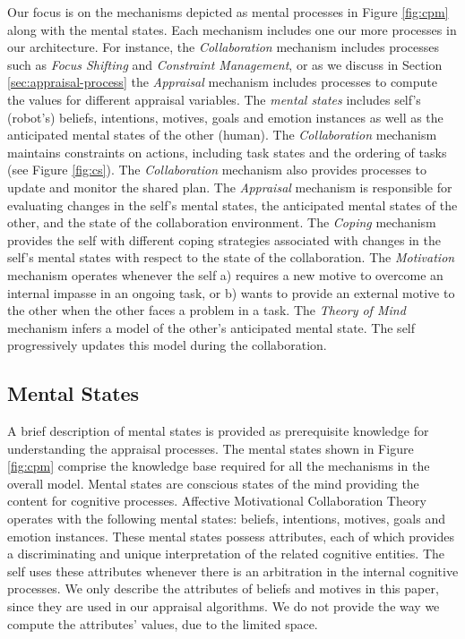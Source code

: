 \documentclass{aamas2016}
\begin{document}
Our focus is on the mechanisms depicted as mental processes in Figure
\ref{fig:cpm} along with the mental states. Each mechanism includes one our
more processes in our architecture. For instance, the \textit{Collaboration}
mechanism includes processes such as \textit{Focus Shifting} and
\textit{Constraint Management}, or as we discuss in Section
\ref{sec:appraisal-process} the \textit{Appraisal} mechanism includes processes
to compute the values for different appraisal variables. The \textit{mental
states} includes self's (robot's) beliefs, intentions, motives, goals and
emotion instances as well as the anticipated mental states of the other (human).
The \textit{Collaboration} mechanism maintains constraints on actions, including
task states and the ordering of tasks (see Figure \ref{fig:cs}). The
\textit{Collaboration} mechanism also provides processes to update and monitor
the shared plan. The \textit{Appraisal} mechanism is responsible for evaluating
changes in the self's mental states, the anticipated mental states of the other,
and the state of the collaboration environment. The \textit{Coping} mechanism
provides the self with different coping strategies associated with changes in
the self's mental states with respect to the state of the collaboration. The
\textit{Motivation} mechanism operates whenever the self a) requires a new
motive to overcome an internal impasse in an ongoing task, or b) wants to
provide an external motive to the other when the other faces a problem in a
task. The \textit{Theory of Mind} mechanism infers a model of the other's
anticipated mental state. The self progressively updates this model during the
collaboration.

\subsection{Mental States}
\label{sec:mental-states}

A brief description of mental states is provided as prerequisite knowledge for
understanding the appraisal processes. The mental states shown in Figure
\ref{fig:cpm} comprise the knowledge base required for all the mechanisms in the
overall model. Mental states are conscious states of the mind providing the
content for cognitive processes. Affective Motivational Collaboration Theory
operates with the following mental states: beliefs, intentions, motives, goals
and emotion instances. These mental states possess attributes, each of which
provides a discriminating and unique interpretation of the related cognitive
entities. The self uses these attributes whenever there is an arbitration in the
internal cognitive processes. We only describe the attributes of beliefs and
motives in this paper, since they are used in our appraisal algorithms. We do
not provide the way we compute the attributes' values, due to the limited space.
\end{document}
